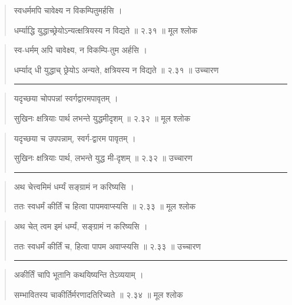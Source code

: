 \begin{quotation}

स्वधर्ममपि चावेक्ष्य न विकम्पितुमर्हसि  ।  

धर्म्याद्धि युद्धाच्छ्रेयोऽन्यत्क्षत्रियस्य न विद्यते  ॥ २.३१ ॥  मूल श्लोक
\end{quotation}

\begin{quotation}

स्व-धर्मम् अपि चावेक्ष्य, न विकम्पि-तुम अर्हसि  ।  

धर्म्याद् धी युद्धाच् छ्रेयोऽ अन्यते, क्षत्रियस्य न विद्यते  ॥ २.३१ ॥  उच्चारण

\noindent\rule{16cm}{0.4pt} 
\end{quotation}


\begin{quotation}

यदृच्छया चोपपन्नां स्वर्गद्वारमपावृतम्‌  ।  

सुखिनः क्षत्रियाः पार्थ लभन्ते युद्धमीदृशम्‌  ॥ २.३२ ॥  मूल श्लोक
\end{quotation}

\begin{quotation}

यदृच्छया च उपपन्नाम्, स्वर्ग-द्वारम पावृतम्‌  ।  

सुखिनः क्षत्रियाः पार्थ, लभन्ते युद्ध मी-दृशम्‌  ॥ २.३२ ॥  उच्चारण

\noindent\rule{16cm}{0.4pt} 
\end{quotation}


\begin{quotation}

अथ चेत्त्वमिमं धर्म्यं सङ्‍ग्रामं न करिष्यसि  ।  

ततः स्वधर्मं कीर्तिं च हित्वा पापमवाप्स्यसि  ॥ २.३३ ॥  मूल श्लोक
\end{quotation}

\begin{quotation}

अथ चेत् त्वम इमं धर्म्यं, सङ्‍ग्रामं न करिष्यसि  ।  

ततः स्वधर्मं कीर्तिं च, हित्वा पापम अवाप्स्यसि  ॥ २.३३ ॥  उच्चारण

\noindent\rule{16cm}{0.4pt} 
\end{quotation}


\begin{quotation}

अकीर्तिं चापि भूतानि कथयिष्यन्ति तेऽव्ययाम्‌  ।  

सम्भावितस्य चाकीर्तिर्मरणादतिरिच्यते  ॥ २.३४ ॥  मूल श्लोक
\end{quotation}

